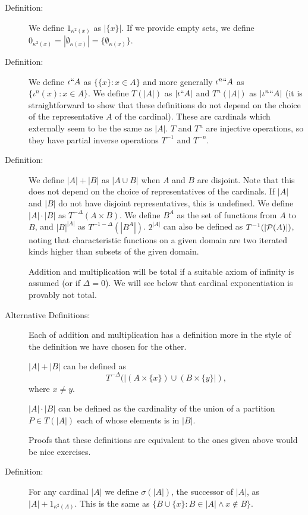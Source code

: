 \documentclass[12pt]{article}
\begin{document}
\begin{description}

\item[Definition:]   We define $1_{\kappa^2(x)}$ as $|\{x\}|$.  If we provide empty sets, we define $0_{\kappa^2(x)}= |\emptyset_{\kappa(x)}| = \{\emptyset_{\kappa(x)}\}$.

\item[Definition:]  We define $\iota``A$ as $\{\{x\}:x \in A\}$ and more generally $\iota^n``A$ as $\{\iota^n(x):x \in A\}$.  We define $T(|A|)$ as $|\iota``A|$ and $T^n(|A|)$ as $|\iota^n``A|$ (it is straightforward to show that these definitions do not depend on the choice of the representative $A$ of the cardinal).  These are cardinals which externally seem to be the same as $|A|$.  $T$ and $T^n$ are injective operations, so they have partial inverse operations $T^{-1}$ and $T^{-n}$.

\item[Definition:]  We define $|A|+|B|$ as $|A \cup B|$ when $A$ and $B$ are disjoint.  Note that this does not depend on the choice of representatives of the cardinals.  If $|A|$ and $|B|$ do not have disjoint representatives, this is undefined.  We define $|A|\cdot|B|$ as $T^{-\Delta}(A \times B)$.   We define $B^A$ as the set of functions from $A$ to $B$, and $|B|^{|A|}$ as $T^{-1-\Delta}(|B^A|)$.  $2^{|A|}$ can also be defined as $T^{-1}(|{\cal P}(A)|)$, noting that characteristic functions on a given domain are two iterated kinds higher than subsets of the given domain. 

 Addition and multiplication will be total if a suitable axiom of infinity is assumed (or if $\Delta=0$).  We will see below that cardinal exponentiation is provably not total.

\item[Alternative Definitions:]  Each of addition and multiplication has a definition more in the style of the definition we have chosen for the other.


$|A|+|B|$ can be defined as $$T^{-\Delta}(|(A \times \{x\})\cup(B \times \{y\}|),$$ where $x \neq y$.  

$|A|\cdot|B|$ can be defined as the cardinality of the union of a partition $P \in T(|A|)$ each of whose elements is in $|B|$.

Proofs that these definitions are equivalent to the ones given above would be nice exercises.

\item[Definition:]  For any cardinal $|A|$ we define $\sigma(|A|)$, the successor of $|A|$, as $|A|+1_{\kappa^2(A)}$.
This is the same as $\{B \cup \{x\}:B \in |A| \wedge x \not\in B\}$.


\end{description}
\end{document}
